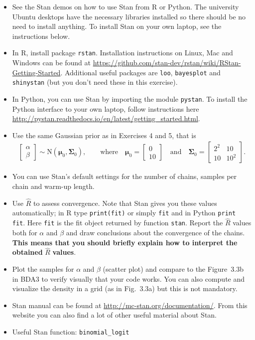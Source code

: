 \documentclass[a4paper,11pt]{article}
\newcommand{\vc}[1] { \mathbf{#1} }
\newcommand{\vs}[1] { \boldsymbol{#1} }
\begin{document}
\begin{itemize}
\item See the Stan demos on how to use Stan from R or Python. The university Ubuntu desktops have the necessary libraries installed so there should be no need to install anything. To install Stan on your own laptop, see the instructions below.
\item In R, install package {\tt rstan}. Installation instructions on Linux, Mac and Windows can be found at \url{https://github.com/stan-dev/rstan/wiki/RStan-Getting-Started}. Additional useful packages are {\tt loo}, {\tt bayesplot} and {\tt shinystan} (but you don't need these in this exercise).
\item In Python, you can use Stan by importing the module {\tt pystan}. To install the Python interface to your own laptop, follow instructions here \url{http://pystan.readthedocs.io/en/latest/getting_started.html}.
\item Use the same Gaussian prior as in Exercises 4 and 5, that is 
\begin{align*}
	\begin{bmatrix}
	\alpha \\ \beta
	\end{bmatrix}
	\sim
	\text{N} \left(\vs \mu_0, \vc \Sigma_0 \right), \qquad
	\text{where} \quad
	\vs \mu_0 = \begin{bmatrix} 0 \\ 10 \end{bmatrix} \quad \text{and} \quad
	\vc \Sigma_0 = \begin{bmatrix} 2^2 & 10 \\ 10 & 10^2 \end{bmatrix}.
\end{align*}
\item You can use Stan's default settings for the  number of chains, samples per chain and warm-up length. 
\item Use $\hat{R}$ to assess convergence. Note that Stan gives you these values automatically; in R type {\tt print(fit)} or simply {\tt fit} and in Python {\tt print fit}. Here {\tt fit} is the fit object returned by function {\tt stan}. Report the $\hat R$ values both for $\alpha$ and $\beta$ and draw conclusions about the convergence of the chains.
\textbf{This means that you should briefly explain how to interpret the obtained} $\hat R$ \textbf{values}.
\item Plot the samples for $\alpha$ and $\beta$ (scatter plot) and compare to the Figure~3.3b in BDA3 to verify visually that your code works. You can also compute and visualize the density in a grid (as in Fig.~3.3a) but this is not mandatory.
\item Stan manual can be found at \url{http://mc-stan.org/documentation/}. From this website you can also find a lot of other useful material about Stan. 
\item Useful Stan function: {\tt binomial\_logit}

\end{itemize}
\end{document}

